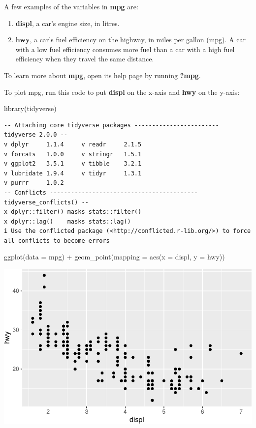 \documentclass[
  letterpaper,
  DIV=11,
  numbers=noendperiod]{scrreprt}
\newenvironment{Shaded}{\begin{snugshade}}{\end{snugshade}}
\newcommand{\AttributeTok}[1]{\textcolor[rgb]{0.40,0.45,0.13}{#1}}
\newcommand{\FunctionTok}[1]{\textcolor[rgb]{0.28,0.35,0.67}{#1}}
\newcommand{\NormalTok}[1]{\textcolor[rgb]{0.00,0.23,0.31}{#1}}
\newcommand{\SpecialCharTok}[1]{\textcolor[rgb]{0.37,0.37,0.37}{#1}}
\begin{document}
A few examples of the variables in \textbf{mpg} are:

\begin{enumerate}
\def\labelenumi{\arabic{enumi}.}
\item
  \textbf{displ}, a car's engine size, in litres.
\item
  \textbf{hwy}, a car's fuel efficiency on the highway, in miles per
  gallon (mpg). A car with a low fuel efficiency consumes more fuel than
  a car with a high fuel efficiency when they travel the same distance.
\end{enumerate}

To learn more about \textbf{mpg}, open its help page by running
\textbf{?mpg}.

To plot mpg, run this code to put \textbf{displ} on the x-axis and
\textbf{hwy} on the y-axis:

\begin{Shaded}
\begin{Highlighting}[]
\FunctionTok{library}\NormalTok{(tidyverse)}
\end{Highlighting}
\end{Shaded}

\begin{verbatim}
-- Attaching core tidyverse packages ------------------------ tidyverse 2.0.0 --
v dplyr     1.1.4     v readr     2.1.5
v forcats   1.0.0     v stringr   1.5.1
v ggplot2   3.5.1     v tibble    3.2.1
v lubridate 1.9.4     v tidyr     1.3.1
v purrr     1.0.2     
-- Conflicts ------------------------------------------ tidyverse_conflicts() --
x dplyr::filter() masks stats::filter()
x dplyr::lag()    masks stats::lag()
i Use the conflicted package (<http://conflicted.r-lib.org/>) to force all conflicts to become errors
\end{verbatim}

\begin{Shaded}
\begin{Highlighting}[]
\FunctionTok{ggplot}\NormalTok{(}\AttributeTok{data =}\NormalTok{ mpg) }\SpecialCharTok{+} 
  \FunctionTok{geom\_point}\NormalTok{(}\AttributeTok{mapping =} \FunctionTok{aes}\NormalTok{(}\AttributeTok{x =}\NormalTok{ displ, }\AttributeTok{y =}\NormalTok{ hwy))}
\end{Highlighting}
\end{Shaded}

\includegraphics{Beginning_Data_Visualization_files/figure-pdf/Example1-1.pdf}
\end{document}
